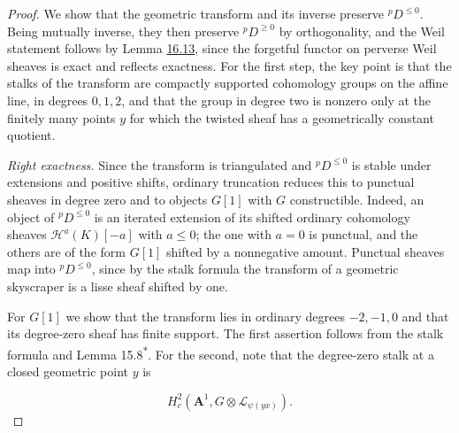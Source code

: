 \documentclass[11pt]{article}
\newcommand{\bpout}[1]{#1\textsuperscript{\hyperlink{bp-outside}{\ensuremath{\ast}}}}
\begin{document}
\begin{proof}[{Proof}]\label{bp49}%
We show that the geometric transform and its inverse preserve \({}^pD^{\le0}\). Being mutually inverse, they then preserve \({}^pD^{\ge0}\) by orthogonality, and the Weil statement follows by Lemma \hyperref[bp40]{16.13}, since the forgetful functor on perverse Weil sheaves is exact and reflects exactness. For the first step, the key point is that the stalks of the transform are compactly supported cohomology groups on the affine line, in degrees \(0,1,2\), and that the group in degree two is nonzero only at the finitely many points \(y\) for which the twisted sheaf has a geometrically constant quotient.

\emph{Right exactness.} Since the transform is triangulated and \({}^pD^{\le0}\) is stable under extensions and positive shifts, ordinary truncation reduces this to punctual sheaves in degree zero and to objects \(G[1]\) with \(G\) constructible. Indeed, an object of \({}^pD^{\le0}\) is an iterated extension of its shifted ordinary cohomology sheaves \(\mathcal H^a(K)[-a]\) with \(a\le0\); the one with \(a=0\) is punctual, and the others are of the form \(G[1]\) shifted by a nonnegative amount. Punctual sheaves map into \({}^pD^{\le0}\), since by the stalk formula the transform of a geometric skyscraper is a lisse sheaf shifted by one.

For \(G[1]\) we show that the transform lies in ordinary degrees \(-2,-1,0\) and that its degree-zero sheaf has finite support. The first assertion follows from the stalk formula and Lemma \bpout{15.8}. For the second, note that the degree-zero stalk at a closed geometric point \(y\) is

\[
H_c^2(\mathbf A^1,G\otimes\mathcal L_{\psi(yx)}).
\]


\end{proof}
\end{document}
